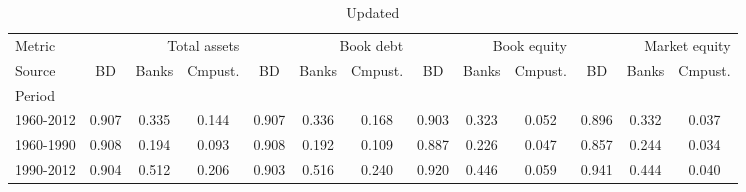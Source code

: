 
    \begin{table}[htbp]
      \centering
      \caption{Updated}
      \label{tab:Table 2}
      \small
      \begin{tabular}{lcccccccccccc}
\toprule
Metric & \multicolumn{3}{r}{Total assets} & \multicolumn{3}{r}{Book debt} & \multicolumn{3}{r}{Book equity} & \multicolumn{3}{r}{Market equity} \\
Source & BD & Banks & Cmpust. & BD & Banks & Cmpust. & BD & Banks & Cmpust. & BD & Banks & Cmpust. \\
Period &  &  &  &  &  &  &  &  &  &  &  &  \\
\midrule
1960-2012 & 0.907 & 0.335 & 0.144 & 0.907 & 0.336 & 0.168 & 0.903 & 0.323 & 0.052 & 0.896 & 0.332 & 0.037 \\
1960-1990 & 0.908 & 0.194 & 0.093 & 0.908 & 0.192 & 0.109 & 0.887 & 0.226 & 0.047 & 0.857 & 0.244 & 0.034 \\
1990-2012 & 0.904 & 0.512 & 0.206 & 0.903 & 0.516 & 0.240 & 0.920 & 0.446 & 0.059 & 0.941 & 0.444 & 0.040 \\
\bottomrule
\end{tabular}

    \end{table}
    